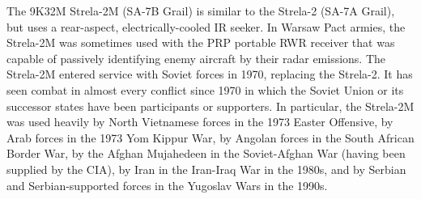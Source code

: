 \begin{withcounters}
    The 9K32M Strela-2M (SA-7B Grail) is similar to the Strela-2 (SA-7A Grail), but uses a rear-aspect, electrically-cooled IR seeker.
    In Warsaw Pact armies, the Strela-2M was sometimes used with the PRP portable RWR receiver that was capable of passively identifying enemy aircraft by their radar emissions.
    The Strela-2M entered service with Soviet forces in 1970, replacing the Strela-2.
    It has seen combat in almost every conflict since 1970 in which the Soviet Union or its successor states have been participants or supporters.
    In particular, the Strela-2M was used heavily by North Vietnamese forces in the 1973 Easter Offensive, by Arab forces in the 1973 Yom Kippur War, by Angolan forces in the South African Border War, by the Afghan Mujahedeen in the Soviet-Afghan War (having been supplied by the CIA), by Iran in the Iran-Iraq War in the 1980s, and by Serbian and Serbian-supported forces in the Yugoslav Wars in the 1990s.%



\end{withcounters}
